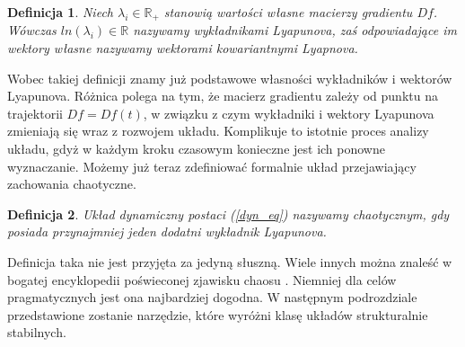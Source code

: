 \documentclass[12pt]{article}
\newtheorem{defi}{Definicja}
\begin{document}
\begin{defi}
	Niech $ \lambda_{i} \in \mathbb{R}_{+} $ stanowią wartości własne macierzy gradientu $ Df $. Wówczas $ ln(\lambda_{i}) \in \mathbb{R} $ nazywamy wykładnikami Lyapunova, zaś odpowiadające im wektory własne nazywamy wektorami kowariantnymi Lyapnova.
\end{defi} 
Wobec takiej definicji znamy już podstawowe własności wykładników i wektorów Lyapunova. Różnica polega na tym, że macierz gradientu zależy od punktu na trajektorii $ Df = Df(t) $, w związku z czym wykładniki i wektory Lyapunova zmieniają się wraz z rozwojem układu. Komplikuje to istotnie proces analizy układu, gdyż w każdym kroku czasowym konieczne jest ich ponowne wyznaczanie. \newline
Możemy już teraz zdefiniować formalnie układ przejawiający zachowania chaotyczne.
\begin{defi}
	Układ dynamiczny postaci (\ref{dyn_eq}) nazywamy chaotycznym, gdy posiada przynajmniej jeden dodatni wykładnik Lyapunova.
\end{defi}
Definicja taka nie jest przyjęta za jedyną słuszną. Wiele innych można znaleść w bogatej encyklopedii poświeconej zjawisku chaosu \cite{Encyclopedie}. Niemniej dla celów pragmatycznych jest ona najbardziej dogodna. W następnym podrozdziale przedstawione zostanie narzędzie, które wyróżni klasę układów strukturalnie stabilnych.
\end{document}
